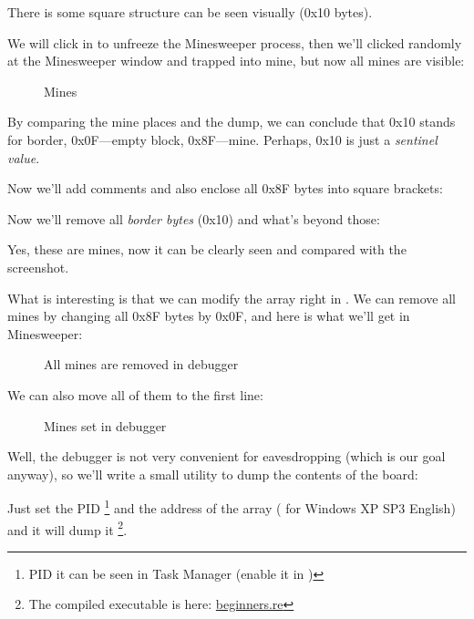 There is some square 
structure can be seen visually (0x10 bytes).

We will click  in \olly to unfreeze the Minesweeper process, then we'll clicked randomly at the Minesweeper window 
and trapped into mine, but now all mines are visible:

\begin{figure}[H]
\centering
{}
\caption{Mines}
\label{fig:minesweeper1}
\end{figure}

By comparing the mine places and the dump, we can conclude that 0x10 stands for border, 0x0F---empty block, 0x8F---mine.
Perhaps, 0x10 is just a \emph{sentinel value}.

Now we'll add comments and also enclose all 0x8F bytes into square brackets:



Now we'll remove all \emph{border bytes} (0x10) and what's beyond those:



Yes, these are mines, now it can be clearly seen and compared with the screenshot.

\clearpage
What is interesting is that we can modify the array right in \olly.
We can remove all mines by changing all 0x8F bytes by 0x0F, and here is what we'll get in Minesweeper:

\begin{figure}[H]
\centering
{}
\caption{All mines are removed in debugger}
\label{fig:minesweeper3}
\end{figure}

We can also move all of them to the first line: 

\begin{figure}[H]
\centering
{}
\caption{Mines set in debugger}
\label{fig:minesweeper2}
\end{figure}

Well, the debugger is not very convenient for eavesdropping (which is our goal anyway), so we'll write a small utility
to dump the contents of the board:



Just set the \ac{PID}
\footnote{PID it can be seen in Task Manager 
(enable it in )} 
and the address of the array ( for Windows XP SP3 English) 
and it will dump it
\footnote{The compiled executable is here: 
\href{http://beginners.re/examples/minesweeper_WinXP/minesweeper_cheater.exe}{beginners.re}}.

